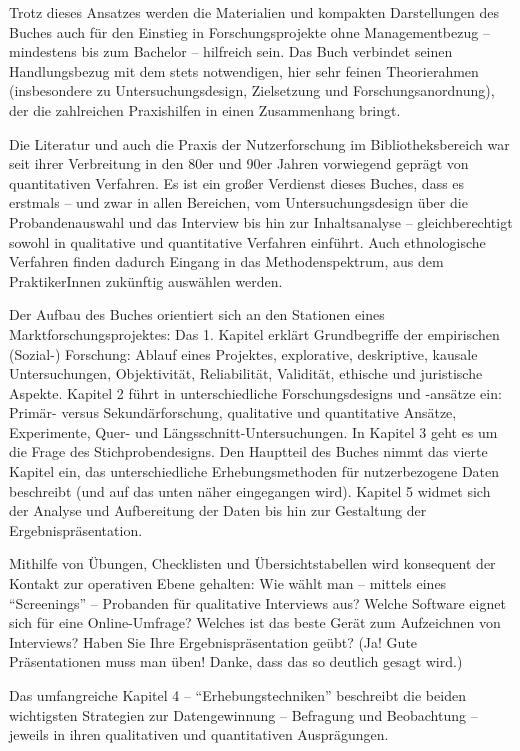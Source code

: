 \documentclass[a4paper,
fontsize=11pt,
oneside,
numbers=noperiodatend,
parskip=half-,
bibliography=totoc,
final
]{scrartcl}
\begin{document}
Trotz dieses Ansatzes werden die Materialien und kompakten Darstellungen
des Buches auch für den Einstieg in Forschungsprojekte ohne
Managementbezug -- mindestens bis zum Bachelor -- hilfreich sein. Das
Buch verbindet seinen Handlungsbezug mit dem stets notwendigen, hier
sehr feinen Theorierahmen (insbesondere zu Untersuchungsdesign,
Zielsetzung und Forschungsanordnung), der die zahlreichen Praxishilfen
in einen Zusammenhang bringt.

Die Literatur und auch die Praxis der Nutzerforschung im
Bibliotheksbereich war seit ihrer Verbreitung in den 80er und 90er
Jahren vorwiegend geprägt von quantitativen Verfahren. Es ist ein großer
Verdienst dieses Buches, dass es erstmals -- und zwar in allen
Bereichen, vom Untersuchungsdesign über die Probandenauswahl und das
Interview bis hin zur Inhaltsanalyse -- gleichberechtigt sowohl in
qualitative und quantitative Verfahren einführt. Auch ethnologische
Verfahren finden dadurch Eingang in das Methodenspektrum, aus dem
PraktikerInnen zukünftig auswählen werden.

Der Aufbau des Buches orientiert sich an den Stationen eines
Marktforschungsprojektes: Das 1. Kapitel erklärt Grundbegriffe der
empirischen (Sozial-) Forschung: Ablauf eines Projektes, explorative,
deskriptive, kausale Untersuchungen, Objektivität, Reliabilität,
Validität, ethische und juristische Aspekte. Kapitel 2 führt in
unterschiedliche Forschungsdesigns und -ansätze ein: Primär- versus
Sekundärforschung, qualitative und quantitative Ansätze, Experimente,
Quer- und Längsschnitt-Untersuchungen. In Kapitel 3 geht es um die Frage
des Stichprobendesigns. Den Hauptteil des Buches nimmt das vierte
Kapitel ein, das unterschiedliche Erhebungsmethoden für nutzerbezogene
Daten beschreibt (und auf das unten näher eingegangen wird). Kapitel 5
widmet sich der Analyse und Aufbereitung der Daten bis hin zur
Gestaltung der Ergebnispräsentation.~

Mithilfe von Übungen, Checklisten und Übersichtstabellen wird konsequent
der Kontakt zur operativen Ebene gehalten: Wie wählt man -- mittels
eines \enquote{Screenings} -- Probanden für qualitative Interviews aus?
Welche Software eignet sich für eine Online-Umfrage? Welches ist das
beste Gerät zum Aufzeichnen von Interviews? Haben Sie Ihre
Ergebnispräsentation geübt? (Ja! Gute Präsentationen muss man üben!
Danke, dass das so deutlich gesagt wird.)

Das umfangreiche Kapitel 4 -- \enquote{Erhebungstechniken} beschreibt
die beiden wichtigsten Strategien zur Datengewinnung -- Befragung und
Beobachtung -- jeweils in ihren qualitativen und quantitativen
Ausprägungen.
\end{document}
